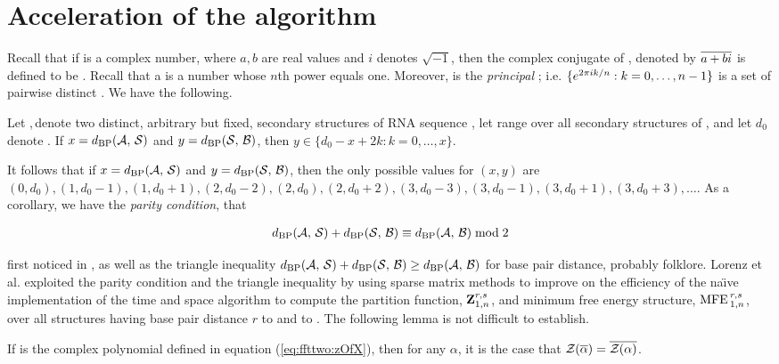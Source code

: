 \section{Acceleration of the \ffttwo algorithm}
\label{sec:ffttwo:perf}

Recall that if \aPbi is a complex number, where $a,b$ are real values and $i$
denotes $\sqrt{-1}$, then the complex conjugate of \aPbi, denoted by
$\overline{a+bi}$ is defined to be \aMbi. Recall that a \nRoU is a number
whose $n$th power equals one. Moreover,
\pRoU is the {\em principal} \nRoU; i.e.
$\{ e^{2 \pi i k/n} : k=0,\dots,n-1 \}$ is a set of pairwise distinct
\nRoUs. We have the following.

\begin{lemma}
\label{lem:ffttwo:lemma1}
Let \strA,\,\strB denote two distinct, arbitrary but fixed,
secondary structures of RNA sequence \seq, let \str range over
all secondary structures of \seq, and let $d_0$ denote \dBP{\strA}{\strB}.
If $x=d_{\text{BP}}(\mathcal A,\,\mathcal S)$ and $y=d_{\text{BP}}(\mathcal S,\,\mathcal B)$, then
$y \in \{ d_0-x+2k: k=0,\dots,x\}$.

It follows that if $x=d_{\text{BP}}(\mathcal A,\,\mathcal S)$ and $y=d_{\text{BP}}(\mathcal S,\,\mathcal B)$,
then the only possible values for
$(x,y)$ are $(0,d_0), (1,d_0-1), (1,d_0+1),
(2,d_0-2), (2,d_0), (2, d_0+2),
(3,d_0-3), (3,d_0-1), (3, d_0+1), (3,d_0+3), \dots$.
As a corollary, we have the {\em parity condition}, that

\begin{align}
\label{eq:ffttwo:parity}
\dBP{\strA}{\str} + \dBP{\str}{\strB} \equiv \dBP{\strA}{\strB} \bmod 2
\end{align}

first noticed in \cite{hofacker:RNAbor2D}, as well as
the triangle inequality
$d_{\text{BP}}(\mathcal A,\,\mathcal S) + d_{\text{BP}}(\mathcal S,\,\mathcal B) \geq d_{\text{BP}}(\mathcal A,\,\mathcal B)$
for base pair distance, probably folklore.
Lorenz et al. \cite{hofacker:RNAbor2D} exploited the parity condition
and the triangle inequality by using sparse matrix methods to improve on
the efficiency of the na\"{\i}ve implementation of the
 time and  space algorithm to compute
the partition function, ${\bf Z}^{r,s}_{1,n}$,
and minimum free energy structure, $\text{MFE\,}^{r,s}_{1,n}$, over all
structures having base pair distance $r$ to \strA and \str to \strB.
The following lemma is not difficult to establish.
\end{lemma}

\begin{lemma}
\label{lem:ffttwo:lemma2}
If \emZ{} is the complex polynomial defined in
equation (\ref{eq:ffttwo:zOfX}), then for any \nRoU
$\alpha$, it is the case that ${\mathcal Z}_{}(\overline{\alpha}) =
\overline{{\mathcal Z}_{}(\alpha)}$.
\end{lemma}

